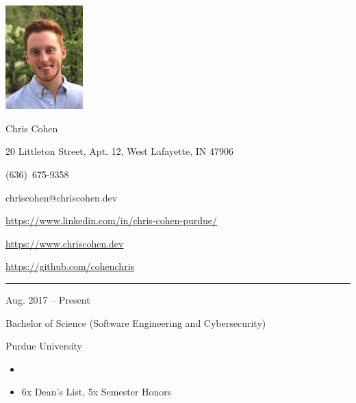 \documentclass[a4paper]{article}
\newlength{\cvcolumngapwidth}
\newlength{\cvleftcolumnwidth}
\newlength{\cvrightcolumnwidth}
\newcommand{\cvnamestyle}[1]{{\Huge\cvnamefont\textcolor{cvnamecolor}{#1}}}
\newcommand{\cvsectionstyle}[1]{{\normalsize\cvsectionfont\textcolor{cvsectioncolor}{#1}}}
\newcommand{\cvtitlestyle}[1]{{\large\cvtitlefont\textcolor{cvtitlecolor}{#1}}}
\newcommand{\cvdurationstyle}[1]{{\small\cvdurationfont\textcolor{cvdurationcolor}{#1}}}
\newcommand{\italicstyle}[1]{{\small\italicfont\textcolor{cvsectioncolor}{#1}}}
\newlength{\cvafteritemskipamount}
\newlength{\cvaftersectionskipamount}
\newlength{\cvafternameskipamount}
\newlength{\cvafterpersonalinfolineskipamount}
\newlength{\cvaftertitleskipamount}
\newlength{\cvparskip}
\newcommand{\cvpersonalinfo}[2]{
    \begin{minipage}[t]{\cvleftcolumnwidth}
        \vspace{0mm} %
        \raggedleft #1
    \end{minipage}%
    \hspace{\cvcolumngapwidth}%
    \begin{minipage}[t]{\cvrightcolumnwidth}
        \vspace{0mm} %
        #2
    \end{minipage}

    \vspace{\cvafteritemskipamount}
}
\newcommand{\cvname}[1]{
    \cvnamestyle{#1}

    \vspace{\cvafternameskipamount}
}
\newcommand{\cvpersonalinfolinewithicon}[3]{
    \raisebox{.5\fontcharht\font`E-.5\height}{\texttt{[image: \#2]}}
    #3

    \vspace{\cvafterpersonalinfolineskipamount}
}
\newcommand{\cvsection}[1]{
    \begin{minipage}[t]{\cvleftcolumnwidth}
        \raggedleft\cvsectionstyle{#1}
    \end{minipage}%
    \hspace{\cvcolumngapwidth}%
    \begin{minipage}[t]{\cvrightcolumnwidth}
        \textcolor{cvrulecolor}{\rule{\cvrightcolumnwidth}{0.3mm}}
    \end{minipage}

    \vspace{\cvaftersectionskipamount}
}
\newcommand{\cvitem}[2]{
    \begin{minipage}[t]{\cvleftcolumnwidth}
        \raggedleft #1
    \end{minipage}%
    \hspace{\cvcolumngapwidth}%
    \begin{minipage}[t]{\cvrightcolumnwidth}
        \setlength{\parskip}{\cvparskip} #2
    \end{minipage}

    \vspace{\cvafteritemskipamount}
}
\newcommand{\cvtitle}[1]{
    \cvtitlestyle{#1}

    \vspace{\cvaftertitleskipamount}
    \vspace{-\cvparskip}
}
\begin{document}

\cvpersonalinfo{
    \includegraphics[height=40mm]{img/me.png}
}{
    \cvname{\textcolor{emphasiscolor}{Chris Cohen}}

    \cvpersonalinfolinewithicon{height=4mm}{img/location.png}{
        20 Littleton Street, Apt. 12, West Lafayette, IN 47906
    }

    \cvpersonalinfolinewithicon{height=4mm, width=4mm}{img/phone.png}{
      (636)\ 675-9358
    }

    \cvpersonalinfolinewithicon{height=4mm}{img/email.png}{
      chriscohen@chriscohen.dev
    }

    \cvpersonalinfolinewithicon{height=4mm}{img/linkedin.png}{
      \href{https://www.linkedin.com/in/chris-cohen-purdue/}{https://www.linkedin.com/in/chris-cohen-purdue/}
    }

    \cvpersonalinfolinewithicon{height=4mm}{img/website.png}{
      \href{https://www.chriscohen.dev}{https://www.chriscohen.dev}
    }

    \cvpersonalinfolinewithicon{height=4mm}{img/github.png}{
      \href{https://github.com/cohenchris}{https://github.com/cohenchris}
    }
}


\cvsection{\LARGE \textcolor{emphasiscolor}{EDUCATION}}

\cvitem{
    \cvdurationstyle{Aug. 2017 -- Present}
}{
    \cvtitle{Bachelor of Science (Software Engineering and Cybersecurity)}

    \italicstyle{Purdue University}

    \begin{itemize}[leftmargin=*]
      \item \large{\regularfont{\textcolor{emphasiscolor}{3.83 GPA}}}
      \normalsize
      \item 6x Dean's List, 5x Semester Honors
    \end{itemize}
}
\end{document}
